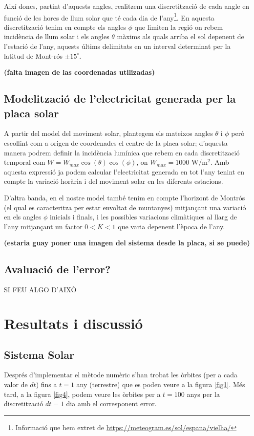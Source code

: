 \documentclass[10pt, twoside, a4paper]{article}
\begin{document}
Així doncs, partint d'aquests angles, realitzem una discretització de cada angle en funció de les hores de llum solar que té cada dia de l'any\footnote{Informació que hem extret de \url{https://meteogram.es/sol/espana/vielha/}}. En aquesta discretització tenim en compte els angles $\phi$ que limiten la regió on rebem incidència de llum solar i els angles $\theta$ màxims als quals arriba el sol depenent de l'estació de l'any, aquests últims delimitats en un interval determinat per la latitud de Mont-rós $\pm 15^\circ$.

\textbf{(falta imagen de las coordenadas utilizadas)}

\subsection{Modelització de l'electricitat generada per la placa solar}
A partir del model del moviment solar, plantegem els mateixos angles $\theta$ i $\phi$ però escollint com a origen de coordenades el centre de la placa solar; d'aquesta manera podrem definir la incidència lumínica que rebem en cada discretització temporal com $W = W_{max}\cos(\theta)\cos(\phi)$, on $W_{max} = 1000 \text{ W/m$^2$}$. Amb aquesta expressió ja podem calcular l'electricitat generada en tot l'any tenint en compte la variació horària i del moviment solar en les diferents estacions.

D'altra banda, en el nostre model també tenim en compte l'horizont de Montrós (el qual es caracteritza per estar envoltat de muntanyes) mitjançant una variació en els angles $\phi$ inicials i finals, i les possibles variacions climàtiques al llarg de l'any mitjançant un factor $0<K<1$ que varia depenent l'època de l'any.

\textbf{(estaria guay poner una imagen del sistema desde la placa, si se puede)}

\subsection{Avaluació de l'error?}
SI FEU ALGO D'AIXÒ

\section{Resultats i discussió}

\subsection{Sistema Solar}
Després d'implementar el mètode numèric s'han trobat les òrbites (per a cada valor de $dt$) fins a $t=1$ any (terrestre) que es poden veure a la figura \ref{fig1}. Més tard, a la figura \ref{fig4}, podem veure les òrbites per a $t=100$ anys per la discretització $dt=1$ dia amb el corresponent error.
 
\end{document}
